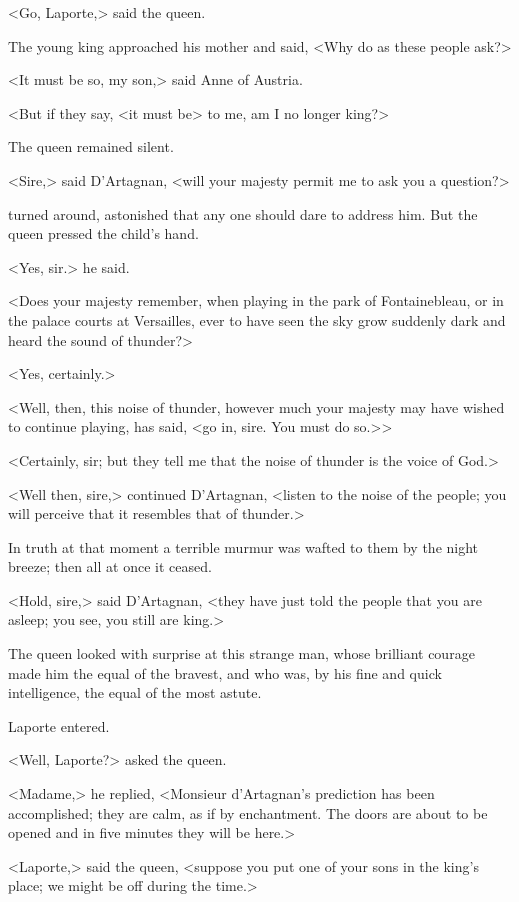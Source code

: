 <Go, Laporte,> said the queen.

The young king approached his mother and said, <Why do as these people ask?>

<It must be so, my son,> said Anne of Austria.

<But if they say, <it must be> to me, am I no longer king?>

The queen remained silent.

<Sire,> said D'Artagnan, <will your majesty permit me to ask you a question?>

 turned around, astonished that any one should dare to address him. But the queen pressed the child's hand.

<Yes, sir.> he said.

<Does your majesty remember, when playing in the park of Fontainebleau, or in the palace courts at Versailles, ever to have seen the sky grow suddenly dark and heard the sound of thunder?>

<Yes, certainly.>

<Well, then, this noise of thunder, however much your majesty may have wished to continue playing, has said, <go in, sire. You must do so.>>

<Certainly, sir; but they tell me that the noise of thunder is the voice of God.>

<Well then, sire,> continued D'Artagnan, <listen to the noise of the people; you will perceive that it resembles that of thunder.>

In truth at that moment a terrible murmur was wafted to them by the night breeze; then all at once it ceased.

<Hold, sire,> said D'Artagnan, <they have just told the people that you are asleep; you see, you still are king.>

The queen looked with surprise at this strange man, whose brilliant courage made him the equal of the bravest, and who was, by his fine and quick intelligence, the equal of the most astute.

Laporte entered.

<Well, Laporte?> asked the queen.

<Madame,> he replied, <Monsieur d'Artagnan's prediction has been accomplished; they are calm, as if by enchantment. The doors are about to be opened and in five minutes they will be here.>

<Laporte,> said the queen, <suppose you put one of your sons in the king's place; we might be off during the time.>

